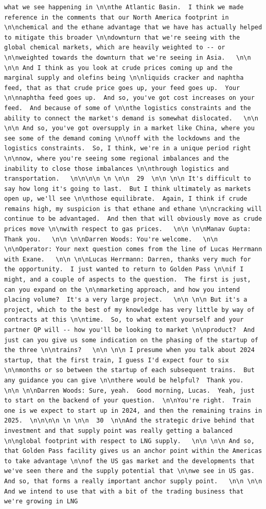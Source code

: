 \documentclass[
  letterpaper,
  DIV=11,
  numbers=noendperiod]{scrreprt}
\begin{document}
\begin{verbatim}
what we see happening in \n\nthe Atlantic Basin.  I think we made reference in the comments that our North America footprint in \n\nchemical and the ethane advantage that we have has actually helped to mitigate this broader \n\ndownturn that we're seeing with the global chemical markets, which are heavily weighted to -- or \n\nweighted towards the downturn that we're seeing in Asia.   \n\n \n\n And I think as you look at crude prices coming up and the marginal supply and olefins being \n\nliquids cracker and naphtha feed, that as that crude price goes up, your feed goes up.  Your \n\nnaphtha feed goes up.  And so, you've got cost increases on your feed.  And because of some of \n\nthe logistics constraints and the ability to connect the market's demand is somewhat dislocated.   \n\n \n\n And so, you've got oversupply in a market like China, where you see some of the demand coming \n\noff with the lockdowns and the logistics constraints.  So, I think, we're in a unique period right \n\nnow, where you're seeing some regional imbalances and the inability to close those imbalances \n\nthrough logistics and transportation.   \n\n\n\n \n \n\n  29  \n\n \n\n It's difficult to say how long it's going to last.  But I think ultimately as markets open up, we'll see \n\nthose equilibrate.  Again, I think if crude remains high, my suspicion is that ethane and ethane \n\ncracking will continue to be advantaged.  And then that will obviously move as crude prices move \n\nwith respect to gas prices.   \n\n \n\nManav Gupta: Thank you.   \n\n \n\nDarren Woods: You're welcome.   \n\n \n\nOperator: Your next question comes from the line of Lucas Herrmann with Exane.   \n\n \n\nLucas Herrmann: Darren, thanks very much for the opportunity.  I just wanted to return to Golden Pass \n\nif I might, and a couple of aspects to the question.  The first is just, can you expand on the \n\nmarketing approach, and how you intend placing volume?  It's a very large project.   \n\n \n\n But it's a project, which to the best of my knowledge has very little by way of contracts at this \n\ntime.  So, to what extent yourself and your partner QP will -- how you'll be looking to market \n\nproduct?  And just can you give us some indication on the phasing of the startup of the three \n\ntrains?   \n\n \n\n I presume when you talk about 2024 startup, that the first train, I guess I'd expect four to six \n\nmonths or so between the startup of each subsequent trains.  But any guidance you can give \n\nthere would be helpful?  Thank you.   \n\n \n\nDarren Woods: Sure, yeah.  Good morning, Lucas.  Yeah, just to start on the backend of your question.  \n\nYou're right.  Train one is we expect to start up in 2024, and then the remaining trains in 2025.  \n\n\n\n \n \n\n  30  \n\nAnd the strategic drive behind that investment and that supply point was really getting a balanced \n\nglobal footprint with respect to LNG supply.   \n\n \n\n And so, that Golden Pass facility gives us an anchor point within the Americas to take advantage \n\nof the US gas market and the developments that we've seen there and the supply potential that \n\nwe see in US gas.  And so, that forms a really important anchor supply point.   \n\n \n\n And we intend to use that with a bit of the trading business that we're growing in LNG 
\end{verbatim}
\end{document}

